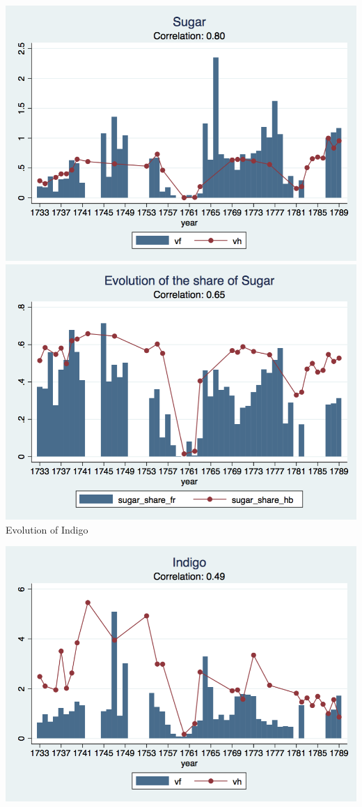 \documentclass[12pt,a4paper,titlepage]{article}
\begin{document}
\includegraphics[scale=.28]{sugar_long.png}
\includegraphics[scale=.28]{sugar_share_long.png}\\
\caption{Evolution of Indigo}
\includegraphics[scale=.28]{indigo_long.png}
\end{document}
